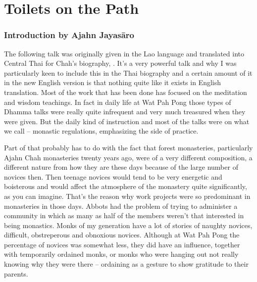 
\chapter{Toilets on the Path}

\subsection*{Introduction by Ajahn Jayas\=aro}

\begingroup\itshape

The following talk was originally given in the Lao language and translated into Central Thai for  Chah's biography, . It's a very powerful talk and why I was particularly keen to include this in the Thai biography and a certain amount of it in the new English version is that nothing quite like it exists in English translation. Most of the work that has been done has focused on the meditation and wisdom teachings. In fact in daily life at Wat Pah Pong those types of Dhamma talks were really quite infrequent and very much treasured when they were given. But the daily kind of instruction and most of the talks were on what we call  -- monastic regulations, emphasizing the  side of practice.

Part of that probably has to do with the fact that forest monasteries, particularly Ajahn Chah monasteries twenty years ago, were of a very different composition, a different nature from how they are these days because of the large number of novices then. Then teenage novices would tend to be very energetic and boisterous and would affect the atmosphere of the monastery quite significantly, as you can imagine. That's the reason why work projects were so predominant in monasteries in those days. Abbots had the problem of trying to administer a community in which as many as half of the members weren't that interested in being monastics. Monks of my generation have a lot of stories of naughty novices, difficult, obstreperous and obnoxious novices. Although at Wat Pah Pong the percentage of novices was somewhat less, they did have an influence, together with temporarily ordained monks, or monks who were hanging out not really knowing why they were there -- ordaining as a gesture to show gratitude to their parents.

